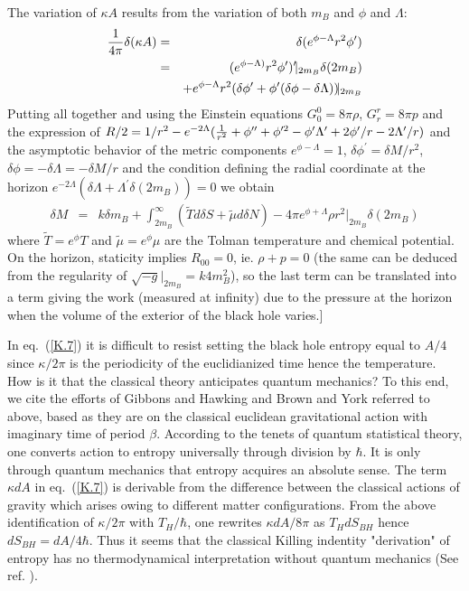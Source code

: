 \documentclass[12pt,oneside]{report}
\def\gd {\delta}
\def\gL {\Lambda}
\begin{document}
The variation of $\kappa A$ results from the variation of
both $m_B$ and $\phi$ and $\gL$: \begin{eqnarray}
{1 \over 4 \pi} \gd (\kappa A ) &=&
\gd ( e^{\phi - \gL} r^2 \phi^\prime)\nonumber\\
&=& ( e^{\phi - \gL)} r^2 \phi^\prime )^\prime
\!\vert_{2 m_B} \gd (2 m_B ) \nonumber\\
&\ &+ e^{\phi - \gL} r^2 (\gd \phi^\prime + \phi^\prime (\gd
\phi - \gd \gL ) )\!\vert_{2 m_B}
\label{par07}
\end{eqnarray}
Putting all together and using the Einstein equations $G_0^0 =
8\pi \rho$, $G^r_r = 8 \pi p$ and the expression of ${R/
2} = {1 / r^2} - e^{-2 \gL} ( {1 \over r^2} +
\phi^{\prime\prime} + \phi^{\prime 2} -\phi^\prime \gL^\prime
+ {2 \phi^\prime / r} - {2 \gL^\prime /r})$ 
and the asymptotic behavior of the metric components $e^{\phi-\gL}=1$, $\gd
\phi^\prime = \gd M/r^2$, $\gd \phi = -\gd \gL = -\gd M/r$
and the condition defining the radial coordinate at the horizon $e^{-2 \gL} (\gd
\gL + \gL^\prime \gd(2m_B))=0$ we obtain
\begin{eqnarray}
\gd M &=& k \gd m_B + \int_{2m_B}^\infty
( \tilde T d \gd S + \tilde \mu d
\gd N )
-4 \pi e^{\phi + \gL} \rho r^2 \!\vert_{2 m_B} \gd(2 m_B)
\label{par08}
\end{eqnarray}
where $\tilde T = e^{\phi }T$ and $\tilde \mu = e^\phi \mu$
are the Tolman temperature and chemical potential.
On the horizon, staticity implies $R_{00}=0$, ie. $\rho + p=0$ (the same can be
deduced from the regularity of $\sqrt{-g}\!\vert_{2 m_B} = k 4 m_B^2$), so the
last term can be translated into a term giving the work (measured at infinity) due
to the pressure at the horizon when the volume of the exterior of the black hole
varies.]

 In eq.~(\ref{K.7}) it
is difficult to resist setting the black hole entropy
equal to $A/4$ since $\kappa/ 2 \pi$ is 
the periodicity of the euclidianized time hence the 
temperature. How is it that the classical theory
anticipates quantum mechanics? 
To this end, we cite the efforts of Gibbons and
Hawking and Brown and York referred to above, based as they are on the classical
euclidean gravitational action with imaginary time of period $\beta$.
 According to the tenets of quantum statistical
theory, one converts action to entropy universally through
division by $\hbar$. It is only through quantum mechanics
that entropy acquires an absolute sense. The term $\kappa dA$
in eq.~(\ref{K.7}) is derivable from the difference between the 
classical actions of gravity
which arises owing to different matter configurations. From the above
identification of $\kappa /2 \pi $ with $T_H/\hbar$, one rewrites
$\kappa dA /8 \pi$ as $T_H dS_{BH}$ hence $dS_{BH} = dA/ 4\hbar$.
 Thus it seems that the classical Killing indentity "derivation" of
entropy has no thermodynamical interpretation without quantum mechanics
(See ref. \cite{EMP}).
\end{document}
